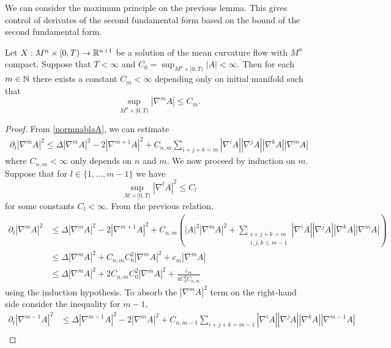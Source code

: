 We can consider the maximum principle on the previous lemma. This gives control of derivates of the second fundamental form based on the bound of the second fundamental form. 

\begin{lemma}
    Let $ X: M^{n} \times [0, T) \to \mathbb{R}^{n+1} $ be a solution of the mean curvature flow with $ M^{n} $ compact. Suppose that $ T < \infty $ and $ C_{0} = \sup_{M^{n} \times [0,T)}|A| < \infty $. Then for each $ m \in \mathbb{N} $ there exists a constant $ C_{m} < \infty $ depending only on initial manifold such that \begin{equation}
        \sup_{M^{n} \times [0,T)} |\nabla^{m}A| \le C_{m}.
    \end{equation}
\end{lemma}

\begin{proof}
    From \cref{normnablaA}, we can estimate \begin{align*}
        \partial_{t}|\nabla^{m}A|^{2} \le \Delta|\nabla^{m}A|^{2} - 2|\nabla^{m+1}A|^{2} + C_{n,m}\sum_{i+j+k=m}^{}|\nabla^{i}A|  |\nabla^{j}A|| \nabla^{k}A|| \nabla^{m}A|
    \end{align*}
    where $ C_{n,m}< \infty $ only depends on $ n $ and $ m $. We now proceed by induction on $ m $. Suppose that for $ l \in \{1, \dots, m-1\} $ we have 
    \[ \sup_{\mathcal{M} \times [0,T)} |\nabla^{l}A|^{2} \le C_{l}\]
    for some constants $ C_{l} < \infty$. From the previous relation, \begin{align}
        \partial_{t}|\nabla^{m}A|^{2} & \le \Delta |\nabla^{m}A|^{2} - 2 |\nabla^{m+1}A|^{2} + C_{n,m} \left( |A|^{2} |\nabla^{m}A|^{2} + \sum_{\substack{i+j+k=m \\
        i,j,k \le m-1}}^{}|\nabla^{i}A||\nabla^{j}A||\nabla^{k}A||\nabla^{m}A|  \right) \nonumber \\
        & \le \Delta|\nabla^{m}A|^{2}+ C_{n,m}C_{0}^{2}|\nabla^{m}A|^{2} + c_{m}|\nabla^{m}A|  \nonumber \\
        & \le \Delta|\nabla^{m}A|^{2} + 2C_{n,m}C_{0}^{2}|\nabla^{m}A|^{2} + \frac{c_{m}}{4C_{0}^{2}C_{n,m}} \label{nablam}
    \end{align}
    using the induction hypothesis. To absorb the $ |\nabla^{m}A|^{2} $ term on the right-hand side consider the inequality for $ m-1 $, \begin{align}
        \partial_{t}|\nabla^{m-1}A|^{2} &\le \Delta |\nabla^{m-1}A|^{2} - 2|\nabla^{m}A|^{2} + C_{n,m-1} \sum_{i+j+k=m-1} |\nabla^{i}A||\nabla^{j}A| |\nabla^{k}A| |\nabla^{m-1}A| \nonumber\\

\end{align}
\end{proof}
